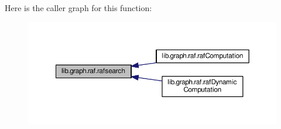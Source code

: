 Here is the caller graph for this function\-:\nopagebreak
\begin{figure}[H]
\begin{center}
\leavevmode
\includegraphics[width=350pt]{a00110_a532a434a0b2fe187a3ff5a8319e4e3b4_icgraph}
\end{center}
\end{figure}


